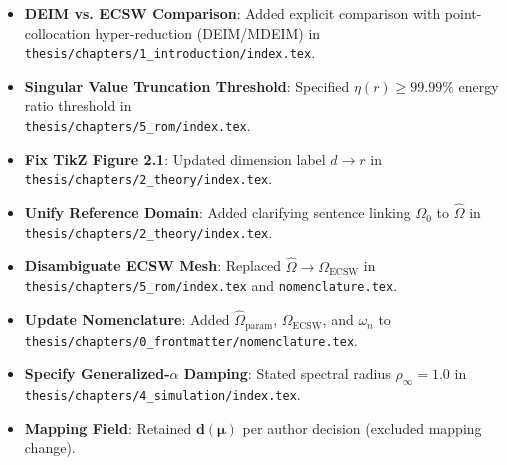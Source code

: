 \documentclass[11pt,a4paper]{article}
\begin{document}
\begin{itemize}[label=$\checkmark$]
    \item \textbf{DEIM vs. ECSW Comparison}: Added explicit comparison with point-collocation hyper-reduction (DEIM/MDEIM) in\\ \texttt{thesis/chapters/1\_introduction/index.tex}.
    \item \textbf{Singular Value Truncation Threshold}: Specified $\eta(r) \ge 99.99\%$ energy ratio threshold in\\ \texttt{thesis/chapters/5\_rom/index.tex}.
    \item \textbf{Fix TikZ Figure 2.1}: Updated dimension label $d \to r$ in\\ \texttt{thesis/chapters/2\_theory/index.tex}.
    \item \textbf{Unify Reference Domain}: Added clarifying sentence linking $\Omega_0$ to $\hat{\Omega}$ in\\ \texttt{thesis/chapters/2\_theory/index.tex}.
    \item \textbf{Disambiguate ECSW Mesh}: Replaced $\widehat{\Omega} \to \Omega_{\text{ECSW}}$ in\\ \texttt{thesis/chapters/5\_rom/index.tex} and \texttt{nomenclature.tex}.
    \item \textbf{Update Nomenclature}: Added $\hat{\Omega}_{\text{param}}$, $\Omega_{\text{ECSW}}$, and $\omega_n$ to\\ \texttt{thesis/chapters/0\_frontmatter/nomenclature.tex}.
    \item \textbf{Specify Generalized-$\alpha$ Damping}: Stated spectral radius $\rho_{\infty} = 1.0$ in\\ \texttt{thesis/chapters/4\_simulation/index.tex}.
    \item \textbf{Mapping Field}: Retained $\mathbf{d}(\boldsymbol{\mu})$ per author decision (excluded mapping change).
\end{itemize}
\end{document}
